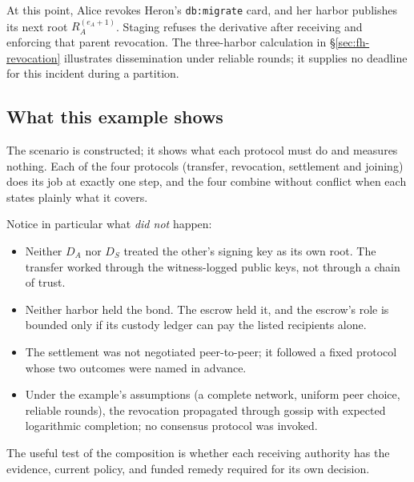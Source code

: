\documentclass[11pt,a4paper]{article}
\theoremstyle{definition}
\theoremstyle{remark}
\begin{document}
At this point, Alice revokes Heron's \texttt{db:migrate}
card, and her harbor publishes its next root $R_A^{(e_A+1)}$. Staging refuses the derivative after receiving
and enforcing that parent revocation. The three-harbor calculation in
\S\ref{sec:fh-revocation} illustrates dissemination under reliable rounds;
it supplies no deadline for this incident during a partition.



\subsection{What this example shows}\label{sec:fh-ex-shows}

%
The scenario is constructed; it shows what each protocol must do and measures nothing. Each of the four protocols (transfer, revocation, settlement and joining) does its job at exactly one step, and the four combine without conflict when each states plainly what it covers.

Notice in particular what \emph{did not} happen:

\begin{itemize}[nosep]
\item Neither $D_A$ nor $D_S$ treated the other's signing key as its own root. The transfer worked through the witness-logged public keys, not through a chain of trust.
\item Neither harbor held the bond. The escrow held it, and the escrow's role is bounded only if its custody ledger can pay the listed recipients alone.
\item The settlement was not negotiated peer-to-peer; it followed a fixed protocol whose two outcomes were named in advance.
\item Under the example's assumptions (a complete network, uniform peer choice, reliable rounds), the revocation propagated through gossip with expected logarithmic completion; no consensus protocol was invoked.
\end{itemize}

The useful test of the composition is whether each receiving authority has
the evidence, current policy, and funded remedy required for its own decision.

\end{document}
